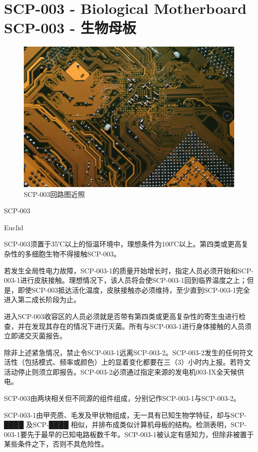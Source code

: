 \chapter[SCP-003 生物母板]{
	SCP-003 - Biological Motherboard\\
	SCP-003 - 生物母板
}

\label{chap:SCP-003}

\begin{figure}[H]
	\centering
	\includegraphics[width=0.5\linewidth]{images/SCP.003.jpg}
	\caption*{SCP-003回路图近照}
\end{figure}

SCP-003

Euclid


SCP-003须置于35℃以上的恒温环境中，理想条件为100℃以上。第四类或更高复杂性的多细胞生物不得接触SCP-003。

若发生全局性电力故障，SCP-003-1的质量开始增长时，指定人员必须开始和SCP-003-1进行皮肤接触。理想情况下，该人员将会使SCP-003-1回到临界温度之上；但是，即使SCP-003抵达活化温度，皮肤接触亦必须维持，至少直到SCP-003-1完全进入第二成长阶段为止。

进入SCP-003收容区的人员必须就是否带有第四类或更高复杂性的寄生虫进行检查，并在发现其存在的情况下进行灭菌。所有与SCP-003-1进行身体接触的人员须立即递交灭菌报告。

除非上述紧急情况，禁止令SCP-003-1远离SCP-003-2。SCP-003-2发生的任何符文活性（包括模式、频率或颜色）上的显着变化都要在三（3）小时内上报。若符文活动停止则须立即报告。SCP-003-2必须通过指定来源的发电机003-IX全天候供电。

SCP-003由两块相关但不同源的组件组成，分别记作SCP-003-1与SCP-003-2。

SCP-003-1由甲壳质、毛发及甲状物组成，无一具有已知生物学特征，却与SCP-████ 及SCP-████ 相似，并排布成类似计算机母板的结构。检测表明，SCP-003-1要先于最早的已知电路板数千年。SCP-003-1被认定有感知力，但除非被置于某些条件之下，否则不具危险性。

